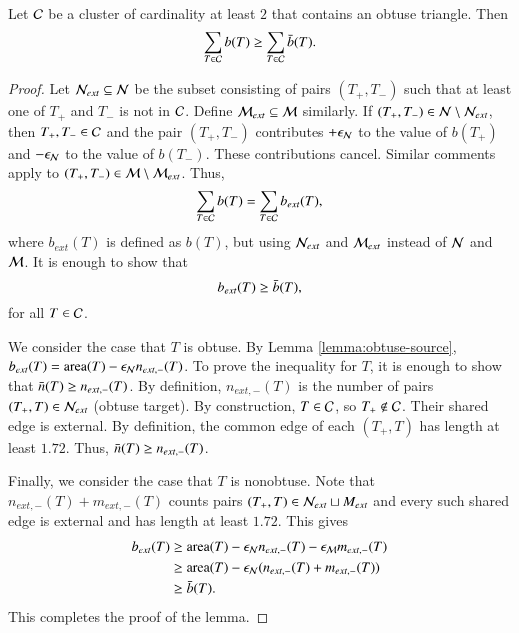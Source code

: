 \begin{lemma} 
  Let $\mathcal C$ be a cluster of cardinality at least $2$ 
  that contains an obtuse triangle.
Then 
\[
\sum_{T\in\mathcal C} b(T)\ge \sum_{T\in\mathcal C} \bar b(T).
\]
\end{lemma}

\begin{proof}
  Let $\mathcal N_{ext}\subseteq \mathcal N$ be the subset consisting of pairs
  $(T_+,T_-)$ such that at least one of $T_+$ and $T_-$ is not in
  $\mathcal C$.  Define $\mathcal M_{ext}\subseteq \mathcal M$ similarly.  If $(T_+,T_-)\in
  \mathcal N\setminus \mathcal N_{ext}$, then $T_+,T_-\in\mathcal C$ and the pair $(T_+,T_-)$
  contributes $+\epsilon_{\mathcal N}$ to the value of $b(T_+)$ and $-\epsilon_{\mathcal N}$ to the
  value of $b(T_-)$.  These contributions cancel.  Similar comments
  apply to $(T_+,T_-)\in\mathcal M\setminus \mathcal M_{ext}$.  Thus,
\[
\sum_{T\in \mathcal C} b(T) = \sum_{T\in \mathcal C} b_{ext}(T),
\]
where $b_{ext}(T)$ is defined as $b(T)$, but using $\mathcal N_{ext}$ and
$\mathcal M_{ext}$ instead of $\mathcal N$ and $\mathcal M$. It is enough to show that
\[
b_{ext}(T) \ge \bar b(T),
\]
for all $T\in\mathcal C$.

We consider the case that $T$ is obtuse.  By Lemma
\ref{lemma:obtuse-source}, $b_{ext}(T) = {\operatorname{area}}(T)-\epsilon_{\mathcal N} n_{ext,-}(T)$.
To prove the inequality for $T$, it is enough to show that $\bar n(T)\ge
n_{ext,-}(T)$.  By definition, $n_{ext,-}(T)$ is the number of pairs
$(T_+,T)\in\mathcal N_{ext}$ (obtuse target).  By construction, $T\in \mathcal C$, so
$T_+\not\in\mathcal C$.  Their shared edge is external.  By definition, the
common edge of each $(T_+,T)$ has length at least $1.72$.  Thus,
$\bar n(T)\ge n_{ext,-}(T)$.



  Finally, we consider the case that $T$ is nonobtuse.  Note that
  $n_{ext,-}(T)+m_{ext,-}(T)$ counts pairs $(T_+,T)\in\mathcal N_{ext}\sqcup
  M_{ext}$ and every such shared edge is external and has length at
  least $1.72$.  This gives
\begin{align*}
b_{ext}(T) &\ge {\operatorname{area}}(T) - \epsilon_{\mathcal N} n_{ext,-}(T) - \epsilon_{\mathcal M} m_{ext,-}(T) \\
&\ge {\operatorname{area}}(T) - \epsilon_{\mathcal N} (n_{ext,-}(T)+m_{ext,-}(T)) \\
&\ge \bar b(T).
\end{align*}
This completes the proof of the  lemma.
\end{proof}

